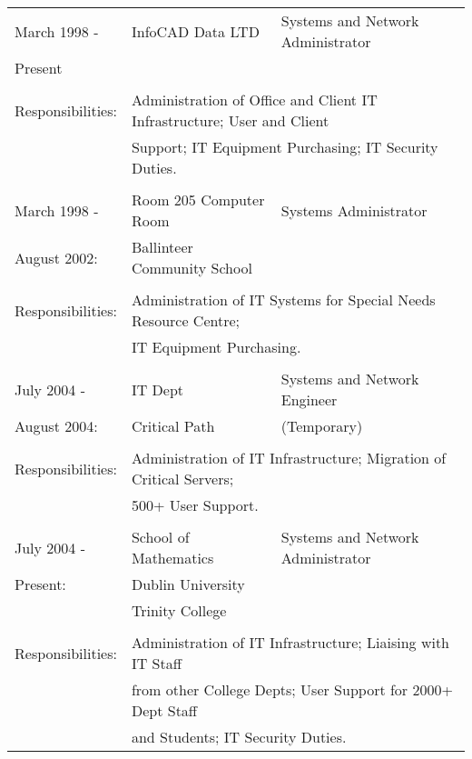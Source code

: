 \documentclass[a4paper, 11pt] {article}
\begin{document}
\begin{tabular}{llll}
March 1998 - 		&	InfoCAD Data LTD	& Systems and Network Administrator	&	\hspace{10mm}	\\
Present    			&			&              &            			\\
      				&			&              &            			\\
Responsibilities:	& \multicolumn{3}{l}{Administration of Office and Client IT Infrastructure; User and Client} 	\\
						& \multicolumn{3}{l}{Support; IT Equipment Purchasing; IT Security Duties.} 	\\
      				&              						&  &	\\
March 1998 -		& 	Room 205 Computer Room			&	Systems Administrator	& \hspace{10mm}	\\
August 2002:		&  Ballinteer Community School	&	&	\\
						& 		&	\\
Responsibilities:	& \multicolumn{3}{l}{Administration of IT Systems for Special Needs Resource Centre;} 	\\
						& \multicolumn{3}{l}{IT Equipment Purchasing.} 	\\
						& 											&	&	\\
July 2004 -			& IT Dept								&	Systems and Network Engineer	& \hspace{10mm}\\
August 2004:		& Critical Path						& (Temporary)	&	\\
						& 											&	&	\\
Responsibilities:	& \multicolumn{3}{l}{Administration of IT Infrastructure; Migration of Critical Servers;}	\\ 
						& \multicolumn{3}{l}{500+ User Support.} 	\\
						&												&\\
July 2004 -			& 	School of Mathematics	&	Systems and Network Administrator &	\\
Present:				& 	Dublin University			&	&	\\
						& 	Trinity College			&	&	\\
						& 									&	&	\\
Responsibilities:	& \multicolumn{3}{l}{Administration of IT Infrastructure; Liaising with IT Staff}	\\ 
						& \multicolumn{3}{l}{from other College Depts; User Support for 2000+ Dept Staff}	\\
						& \multicolumn{3}{l}{and Students; IT Security Duties.} 	\\
\end{tabular}
\end{document}
